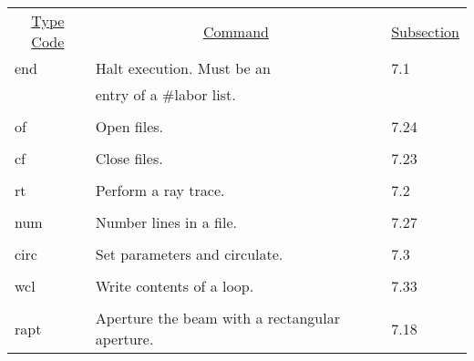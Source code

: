 \begin{center}
\begin{tabular}{lll}
\multicolumn{1}{c}{\underline {Type Code}} &
\multicolumn{1}{c}{\underline{Command}}   &
\multicolumn{1}{c}{\underline{Subsection}} \\
\hspace{1.5em}end   &        Halt execution.  Must be an         & \hspace{2em}7.1\\
                    & entry of a \#labor list.                  &\\
\vspace{-3mm}& &\\
\hspace{1.5em}of   &         Open files.                          & \hspace{2em}7.24\\
\vspace{-3mm}& &\\
\hspace{1.5em}cf    &        Close files.                          & \hspace{2em}7.23\\
\vspace{-3mm}& &\\
\hspace{1.5em}rt    &        Perform a ray trace.                  & \hspace{2em}7.2\\
\vspace{-3mm}& &\\
\hspace{1.5em}num   &        Number lines in a file.               & \hspace{2em}7.27\\
\vspace{-3mm}& &\\
\hspace{1.5em}circ  &         Set parameters and circulate.        & \hspace{2em}7.3\\
\vspace{-3mm}& &\\
\hspace{1.5em}wcl   &         Write contents of a loop.            & \hspace{2em}7.33\\
\vspace{-3mm}& &\\
\hspace{1.5em}rapt  & Aperture the beam with a rectangular aperture.& \hspace{2em}7.18\\

\end{tabular}
\end{center}
